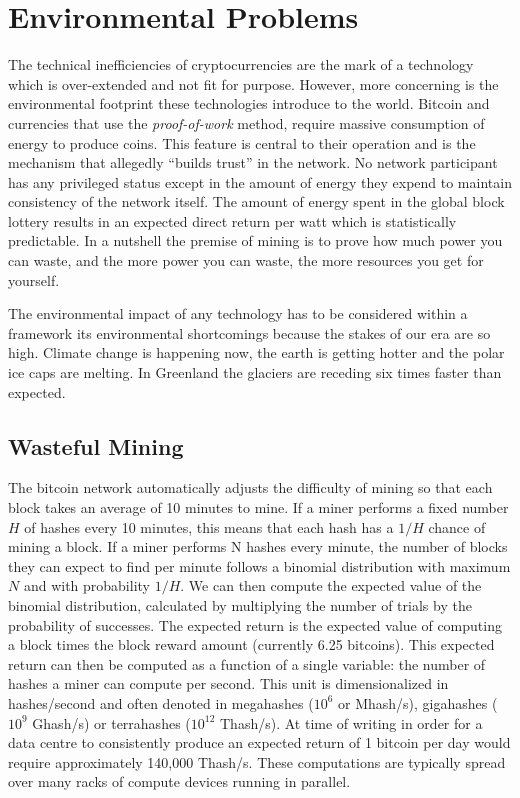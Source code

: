\chapter{Environmental Problems}

The technical inefficiencies of cryptocurrencies are the mark of a technology
which is over-extended and not fit for purpose. However, more concerning is the
environmental footprint these technologies introduce to the world. Bitcoin and
currencies that use the \textit{proof-of-work} method, require massive
consumption of energy to produce coins. This feature is central to their
operation and is the mechanism that allegedly ``builds trust'' in the network.
No network participant has any privileged status except in the amount of energy
they expend to maintain consistency of the network itself. The amount of energy
spent in the global block lottery results in an expected direct return per watt
which is statistically predictable. In a nutshell the premise of mining is to
prove how much power you can waste, and the more power you can waste, the more
resources you get for yourself. \cite{gerard_attack_2017}

The environmental impact of any technology has to be considered within a
framework its environmental shortcomings because the stakes of our era are so
high. Climate change is happening now, the earth is getting hotter and the polar
ice caps are melting. In Greenland the glaciers are receding six times faster
than expected.

\section{Wasteful Mining}

The bitcoin network automatically adjusts the difficulty of mining so that each
block takes an average of 10 minutes to mine. If a miner performs a fixed number
$H$ of hashes every 10 minutes, this means that each hash has a $1/H$ chance of
mining a block. If a miner performs N hashes every minute, the number of blocks
they can expect to find per minute follows a binomial distribution with maximum
$N$ and with probability $1/H$. We can then compute the expected value of the
binomial distribution, calculated by multiplying the number of trials by the
probability of successes. The expected return is the expected value of computing
a block times the block reward amount (currently 6.25 bitcoins). This expected
return can then be computed as a function of a single variable: the number of
hashes a miner can compute per second.  This unit is dimensionalized in
hashes/second and often denoted in megahashes ($10^6$ or Mhash/s), gigahashes
($10^9$ Ghash/s) or terrahashes ($10^{12}$ Thash/s). At time of writing in order
for a data centre to consistently produce an expected return of 1 bitcoin per
day would require approximately 140,000 Thash/s.  These computations are
typically spread over many racks of compute devices running in parallel.

